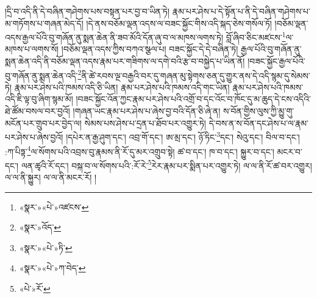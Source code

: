 །དྲི་བ་འདི་ནི་དེ་བཞིན་གཤེགས་པས་བསྟན་པར་བྱ་བ་ཡིན་ཏེ། རྣམ་པར་ཤེས་པ་དེ་སྟོན་པ་ནི་དེ་བཞིན་གཤེགས་པ་མ་གཏོགས་པ་གཞན་མེད་དོ། །དེ་ནས་བཅོམ་ལྡན་འདས་ལ་བཟང་སྐྱོང་གིས་འདི་སྐད་ཅེས་གསོལ་ཏོ། །བཅོམ་ལྡན་འདས་རྒྱལ་པོའི་བུ་གཞོན་ནུ་སྨན་ཆེན་ནི་ཟབ་མོའི་དོན་ཞུ་བ་ལ་མཁས་ལགས་ཏེ། བློ་ཞིབ་ཅིང་མཛངས་\footnote{«སྣར་»«པེ་»འཛངས་}ལ་མཁས་པ་ལགས་སོ། །བཅོམ་ལྡན་འདས་ཀྱིས་བཀའ་སྩལ་པ། བཟང་སྐྱོང་དེ་དེ་བཞིན་ཏེ། རྒྱལ་པོའི་བུ་གཞོན་ནུ་སྨན་ཆེན་འདི་ནི་བཅོམ་ལྡན་འདས་རྣམ་པར་གཟིགས་ལ་དགེ་བའི་རྩ་བ་བསྐྱེད་པ་ཡིན་ནོ། །བཟང་སྐྱོང་རྒྱལ་པོའི་བུ་གཞོན་ནུ་སྨན་ཆེན་འདི་\footnote{«སྣར་»འོད་}ནི་ཚེ་རབས་ལྔ་བརྒྱའི་བར་དུ་གཞན་མུ་སྟེགས་ཅན་དུ་གྱུར་ནས་དེ་འདི་སྙམ་དུ་སེམས་ཏེ། རྣམ་པར་ཤེས་པའི་ཁམས་འདི་ཅི་ཡིན། རྣམ་པར་ཤེས་པའི་ཁམས་འདི་གང་ཡིན། རྣམ་པར་ཤེས་པའི་ཁམས་འདི་ཇི་ལྟ་བུ་ཞིག་སྙམ་མོ། །བཟང་སྐྱོང་འོན་ཀྱང་རྣམ་པར་ཤེས་པའི་འགྲོ་བ་དང་འོང་བ་ཁོང་དུ་མ་ཆུད་དེ་ངས་འདིའི་ཐེ་ཚོམ་བསལ་བར་བྱའོ། །གཞན་ཡང་རྣམ་པར་ཤེས་པ་ཞེས་བྱ་བའི་དོན་ཅི་ཞེ་ན། ས་བོན་གྱིས་ལུས་ཀྱི་མྱུ་གུ་མངོན་པར་གྲུབ་པར་བྱེད་ལ། སེམས་པས་ཤེས་པ་དྲན་པ་ཐོབ་པར་འགྱུར་ཏེ། དེ་བས་ན་ས་བོན་དང་ཤེས་པ་ལ་རྣམ་པར་ཤེས་པ་ཞེས་བྱའོ། །དཔེར་ན་རྒྱ་ཤུག་དང་། འབྲ་གོ་དང་། ཨ་མྲ་དང་། ཉོ་ཏིང་\footnote{«སྣར་»«པེ་»ཏི་}དང་། སེའུ་དང་། བིལ་བ་དང་། :ཀ་པིཏྟ་\footnote{«སྣར་»«པེ་»ཀ་བེད་}ལ་སོགས་པའི་འབྲས་བུ་རྣམས་ནི་རོ་དུ་མར་འགྲུབ་སྟེ། ཚ་བ་དང་། ཁ་བ་དང་། སྐྱུར་བ་དང་། མངར་བ་དང་། ལན་ཚྭའི་རོ་དང་། བསྐ་བ་ལ་སོགས་པའི་:རོ་རེ་\footnote{«པེ་»རོ་}རེར་རྣམ་པར་སྨིན་པར་འགྱུར་ཏེ། ལ་ལ་ནི་རོ་ཚ་བར་འགྱུར། ལ་ལ་ནི་སྐྱུར། ལ་ལ་ནི་མངར་རོ། །
